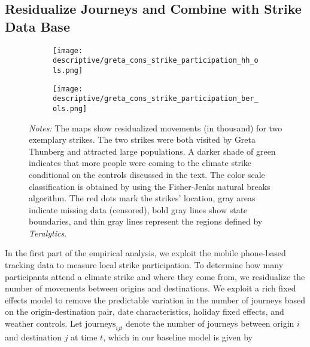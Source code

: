 \subsection{Residualize Journeys and Combine with Strike Data Base}

\begin{figure}[t]\centering
	\caption{Strike participation for selected strikes}
	\label{fig_greta_cons:strike_participation_hh_ber}
	\begin{subfigure}[h]{0.45\linewidth}\centering
		\texttt{[image: descriptive/greta\_cons\_strike\_participation\_hh\_ols.png]}
	\end{subfigure}
	\begin{subfigure}[h]{0.45\linewidth}\centering
		\texttt{[image: descriptive/greta\_cons\_strike\_participation\_ber\_ols.png]}
	\end{subfigure}
	\begin{minipage}{0.9\linewidth}
		\scriptsize{\emph{Notes:} The maps show residualized movements (in thousand) for two exemplary strikes. The two strikes were both visited by Greta Thunberg and attracted large populations. A darker shade of green indicates that more people were coming to the climate strike conditional on the controls discussed in the text. The color scale classification is obtained by using the Fisher-Jenks natural breaks algorithm. The red dots mark the strikes' location, gray areas indicate missing data (censored), bold gray lines show state boundaries, and thin gray lines represent the regions defined by \textit{Teralytics}.}
	\end{minipage}
\end{figure}

In the first part of the empirical analysis, we exploit the mobile phone-based tracking data to measure local strike participation. To determine how many participants attend a climate strike and where they come from, we residualize the number of movements between origins and destinations. We exploit a rich fixed effects model to remove the predictable variation in the number of journeys based on the origin-destination pair, date characteristics, holiday fixed effects, and weather controls. Let $\text{journeys}_{ijt}$ denote the number of journeys between origin $i$ and destination $j$ at time $t$, which in our baseline model is given by 

